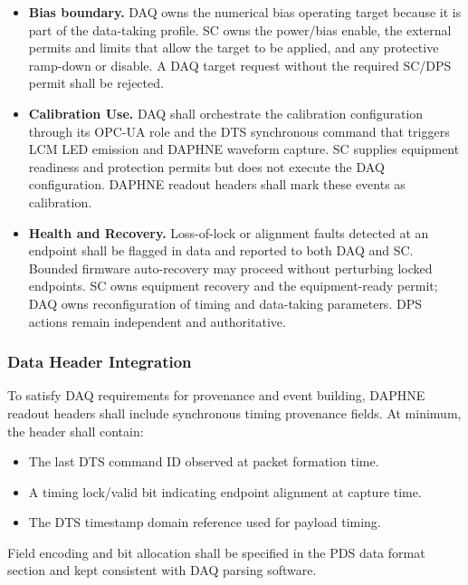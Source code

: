 \begin{itemize}
\begin{itemize}[nosep]
  \end{itemize}
  Every request shall identify its authenticated OPC-UA role, detector or partition, affected board and channel scope, run type, configuration revision or hash, configuration generation, and correlation identifier. The gateway shall authorize the requested method and fields, evaluate operating-state and external-permit guards, translate them to the compatible board protocol, and serialize all accepted board mutations. Method results shall distinguish \emph{accepted}, \emph{applied}, and \emph{verified}; timeout, retry, idempotency, cancellation, and stale-generation behavior shall be specified per method. The board service shall independently reject invalid or unsafe requests. SC may revoke the equipment-ready permit or apply a safe state, but it shall not edit the DAQ configuration. After such an action, DAQ shall apply and verify a fresh run configuration through the gateway before data taking resumes.
  \item\textbf{Bias boundary.} DAQ owns the numerical bias operating target because it is part of the data-taking profile. SC owns the power/bias enable, the external permits and limits that allow the target to be applied, and any protective ramp-down or disable. A DAQ target request without the required SC/DPS permit shall be rejected.
  \item\textbf{Calibration Use.} DAQ shall orchestrate the calibration configuration through its OPC-UA role and the DTS synchronous command that triggers LCM LED emission and DAPHNE waveform capture. SC supplies equipment readiness and protection permits but does not execute the DAQ configuration. DAPHNE readout headers shall mark these events as calibration.
  \item\textbf{Health and Recovery.} Loss-of-lock or alignment faults detected at an endpoint shall be flagged in data and reported to both DAQ and SC. Bounded firmware auto-recovery may proceed without perturbing locked endpoints. SC owns equipment recovery and the equipment-ready permit; DAQ owns reconfiguration of timing and data-taking parameters. DPS actions remain independent and authoritative.
\end{itemize}

\subsubsection{Data Header Integration}
\label{subsec:timing-header}

To satisfy DAQ requirements for provenance and event building, DAPHNE readout headers shall include synchronous timing provenance fields. At minimum, the header shall contain:
\begin{itemize}
  \item The last DTS command ID observed at packet formation time.
  \item A timing lock/valid bit indicating endpoint alignment at capture time.
  \item The DTS timestamp domain reference used for payload timing.
\end{itemize}
Field encoding and bit allocation shall be specified in the PDS data format section and kept consistent with DAQ parsing software.


